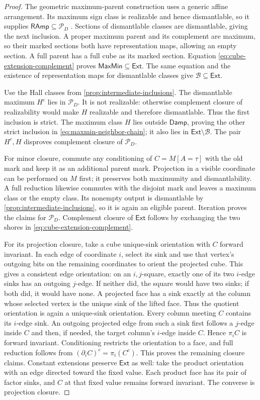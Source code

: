 \documentclass[11pt]{article}
\theoremstyle{definition}
\newcommand{\MaxMin}{\mathsf{MaxMin}}
\newcommand{\Damp}{\mathsf{Damp}}
\newcommand{\RAmp}{\mathsf{RAmp}}
\begin{document}
\begin{proof}
The geometric maximum-parent construction uses a generic affine
arrangement. Its maximum sign class is realizable and hence dismantlable,
so it supplies $\RAmp\subseteq\mathcal P_D$ \cite{MaxParents}.
Sections of dismantlable classes are dismantlable, giving the next
inclusion. A proper maximum parent and its complement are maximum, so their
marked sections both have representation maps, allowing an empty section.
A full parent has a full cube as its marked section. Equation
\eqref{eq:cube-extension-complement} proves
$\MaxMin\subseteq\mathsf{Ext}$. The same equation and the existence of
representation maps for dismantlable classes give
$\mathcal B\subseteq\mathsf{Ext}$.

Use the Hall classes from \cref{prop:intermediate-inclusions}.
The dismantlable maximum $H^c$ lies in $\mathcal P_D$. It is not
realizable: otherwise complement closure of realizability would make
$H$ realizable and therefore dismantlable. Thus the first inclusion is
strict. The maximum class $H$ lies outside $\Damp$, proving the other
strict inclusion in \eqref{eq:maxmin-neighbor-chain}; it also lies in
$\mathsf{Ext}\setminus\mathcal B$. The pair $H^c,H$ disproves complement
closure of $\mathcal P_D$.

For minor closure, commute any conditioning of $C=M[A=\tau]$ with the
old mark and keep it as an additional parent mark. Projection in a visible
coordinate can be performed on $M$ first; it preserves both maximumity
and dismantlability. A full reduction likewise commutes with the disjoint
mark and leaves a maximum class or the empty class. Its nonempty output
is dismantlable by \cref{prop:intermediate-inclusions}, so it is again an
eligible parent. Iteration proves the claims for $\mathcal P_D$.
Complement closure of $\mathsf{Ext}$ follows by exchanging the two shores
in \eqref{eq:cube-extension-complement}.

For its projection closure, take a cube unique-sink orientation with $C$
forward invariant. In each edge of coordinate $i$, select its sink and
use that vertex's outgoing bits on the remaining coordinates to orient
the projected cube. This gives a consistent edge orientation: on an
$i,j$-square, exactly one of its two $i$-edge sinks has an outgoing
$j$-edge. If neither did, the square would have two sinks; if both did,
it would have none. A projected face has a sink exactly at the column
whose selected vertex is the unique sink of the lifted face. Thus the
quotient orientation is again a unique-sink orientation.
Every column meeting $C$ contains its $i$-edge sink. An outgoing projected
edge from such a sink first follows a $j$-edge inside $C$ and then, if
needed, the target column's $i$-edge inside $C$. Hence $\pi_i C$ is
forward invariant. Conditioning restricts the orientation to a face,
and full reduction follows from
$(\partial_i C)^c=\pi_i(C^c)$. This proves the remaining closure claims.
Constant extensions preserve $\mathsf{Ext}$ as well: take the product
orientation with an edge directed toward the fixed value. Each product
face has its pair of factor sinks, and $C$ at that fixed value remains
forward invariant. The converse is projection closure.
\end{proof}
\end{document}
